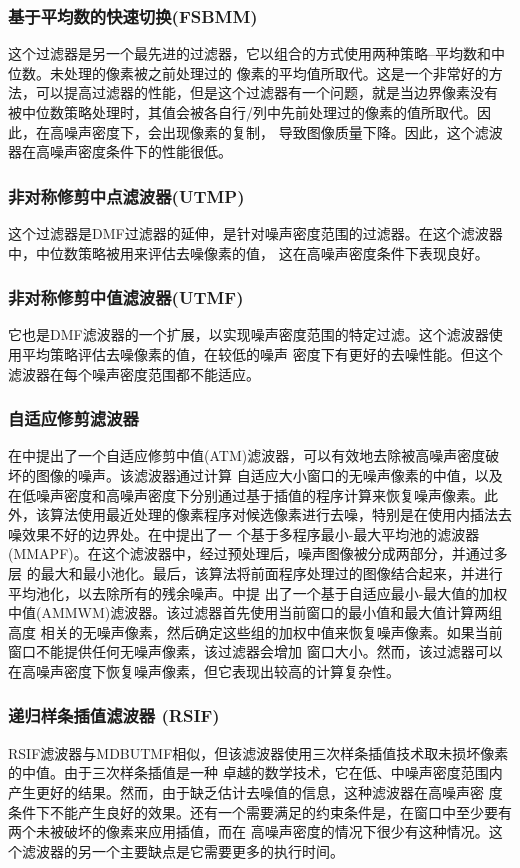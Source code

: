 \documentclass[12pt]{article} %
\begin{document}
\subsubsection{基于平均数的快速切换(FSBMM)}
这个过滤器是另一个最先进的过滤器，它以组合的方式使用两种策略--平均数和中位数\cite{ref29}。未处理的像素被之前处理过的
像素的平均值所取代。这是一个非常好的方法，可以提高过滤器的性能，但是这个过滤器有一个问题，就是当边界像素没有
被中位数策略处理时，其值会被各自行/列中先前处理过的像素的值所取代。因此，在高噪声密度下，会出现像素的复制，
导致图像质量下降。因此，这个滤波器在高噪声密度条件下的性能很低。

\subsubsection{非对称修剪中点滤波器(UTMP)}
这个过滤器是DMF过滤器的延伸，是针对噪声密度范围的过滤器。在这个滤波器中，中位数策略被用来评估去噪像素的值，
这在高噪声密度条件下表现良好。

\subsubsection{非对称修剪中值滤波器(UTMF)}
它也是DMF滤波器的一个扩展，以实现噪声密度范围的特定过滤。这个滤波器使用平均策略评估去噪像素的值，在较低的噪声
密度下有更好的去噪性能。但这个滤波器在每个噪声密度范围都不能适应。

\subsubsection{自适应修剪滤波器}
在\cite{ref13}中提出了一个自适应修剪中值(ATM)滤波器，可以有效地去除被高噪声密度破坏的图像的噪声。该滤波器通过计算
自适应大小窗口的无噪声像素的中值，以及在低噪声密度和高噪声密度下分别通过基于插值的程序计算来恢复噪声像素。此
外，该算法使用最近处理的像素程序对候选像素进行去噪，特别是在使用内插法去噪效果不好的边界处。在\cite{ref22}中提出了一
个基于多程序最小-最大平均池的滤波器(MMAPF)。在这个滤波器中，经过预处理后，噪声图像被分成两部分，并通过多层
的最大和最小池化。最后，该算法将前面程序处理过的图像结合起来，并进行平均池化，以去除所有的残余噪声。\cite{ref14}中提
出了一个基于自适应最小-最大值的加权中值(AMMWM)滤波器。该过滤器首先使用当前窗口的最小值和最大值计算两组高度
相关的无噪声像素，然后确定这些组的加权中值来恢复噪声像素。如果当前窗口不能提供任何无噪声像素，该过滤器会增加
窗口大小。然而，该过滤器可以在高噪声密度下恢复噪声像素，但它表现出较高的计算复杂性。

\subsubsection{递归样条插值滤波器 (RSIF)}
RSIF滤波器\cite{ref28}与MDBUTMF\cite{ref11}相似，但该滤波器使用三次样条插值技术取未损坏像素的中值。由于三次样条插值是一种
卓越的数学技术，它在低、中噪声密度范围内产生更好的结果。然而，由于缺乏估计去噪值的信息，这种滤波器在高噪声密
度条件下不能产生良好的效果。还有一个需要满足的约束条件是，在窗口中至少要有两个未被破坏的像素来应用插值，而在
高噪声密度的情况下很少有这种情况。这个滤波器的另一个主要缺点是它需要更多的执行时间。
\end{document}
